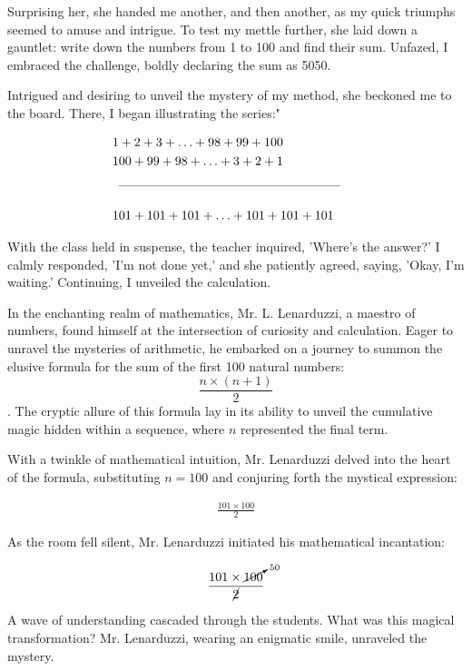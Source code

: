 \documentclass[12pt,a4paper]{article}
\begin{document}
Surprising her, she handed me another, and then another, as my quick triumphs seemed to amuse and intrigue. To test my mettle further, she laid down a gauntlet: write down the numbers from 1 to 100 and find their sum. Unfazed, I embraced the challenge, boldly declaring the sum as 5050.

Intrigued and desiring to unveil the mystery of my method, she beckoned me to the board. There, I began illustrating the series:"

\begin{center}
    \begin{align*}
        &1+2+3+\ldots+98+99+100 \\
        &100+99+98+\ldots+3+2+1 \\
        \cmidrule(lr){1-4} &&&& \\[-1.5ex]
        &101+101+101+\ldots+101+101+101
    \end{align*}
\end{center}


With the class held in suspense, the teacher inquired, 'Where's the answer?' I calmly responded, 'I'm not done yet,' and she patiently agreed, saying, 'Okay, I'm waiting.' Continuing, I unveiled the calculation.

In the enchanting realm of mathematics, Mr. L. Lenarduzzi, a maestro of numbers, found himself at the intersection of curiosity and calculation. Eager to unravel the mysteries of arithmetic, he embarked on a journey to summon the elusive formula for the sum of the first 100 natural numbers: 
\[\frac{n \times (n+1)}{2}\]. The cryptic allure of this formula lay in its ability to unveil the cumulative magic hidden within a sequence, where \(n\) represented the final term.

With a twinkle of mathematical intuition, Mr. Lenarduzzi delved into the heart of the formula, substituting \(n = 100\) and conjuring forth the mystical expression:

\begin{align*}
    \frac{101 \times 100}{2}
\end{align*}

As the room fell silent, Mr. Lenarduzzi initiated his mathematical incantation:

\begin{align*}
    \frac{101 \times \cancelto{50}{100}}{\cancel{2}}
\end{align*}

A wave of understanding cascaded through the students. What was this magical transformation? Mr. Lenarduzzi, wearing an enigmatic smile, unraveled the mystery.
\end{document}

